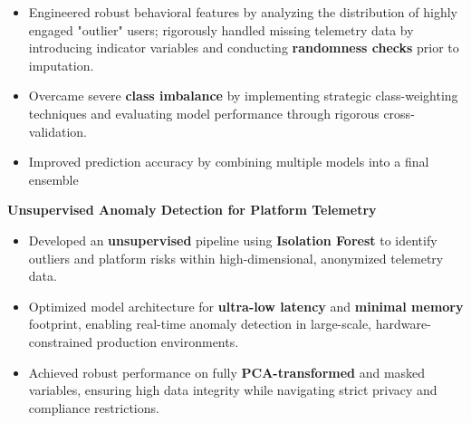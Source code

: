 \begin{cventries}
{\begin{cvitems}
\begin{itemize}
          \item {
            Engineered robust behavioral features by analyzing the distribution of 
            highly engaged "outlier" users; 
            rigorously handled missing telemetry data by introducing indicator variables 
            and conducting \textbf{randomness checks} prior to imputation.
          }
          \item {
            Overcame severe \textbf{class imbalance} by implementing strategic class-weighting techniques 
            and evaluating model performance through rigorous cross-validation.
          }
          \item {
            Improved prediction accuracy by combining multiple models into a final ensemble
          }
        \end{itemize}
      \vspace{0.5mm}
      \item {\textbf{Unsupervised Anomaly Detection for Platform Telemetry}}
        \begin{itemize}
          \item {
            Developed an \textbf{unsupervised} pipeline using \textbf{Isolation Forest} to 
            identify outliers and platform risks within high-dimensional, anonymized telemetry data.
          }
          \item {
            Optimized model architecture for \textbf{ultra-low latency} and 
            \textbf{minimal memory} footprint, enabling real-time anomaly detection 
            in large-scale, hardware-constrained production environments.
          }
          \item {
            Achieved robust performance on fully \textbf{PCA-transformed} and masked variables, 
            ensuring high data integrity while navigating strict privacy and compliance restrictions.
          }
        \end{itemize}
    \end{cvitems}
  }


\end{cventries}
